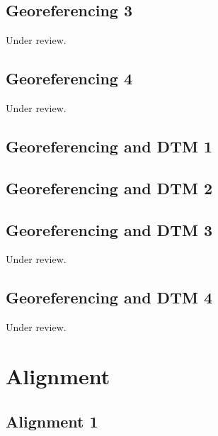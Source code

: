 \documentclass{scrartcl}
\begin{document}
\subsection{Georeferencing 3}
\label{sec:georeferencing_3}
Under review.%
\clearpage

\subsection{Georeferencing 4}
\label{sec:georeferencing_4}
Under review.%
\clearpage

\subsection{Georeferencing and DTM 1}
\label{sec:georef_tin_1}
\clearpage

\subsection{Georeferencing and DTM 2}
\label{sec:georef_tin_2}
\clearpage

\subsection{Georeferencing and DTM 3}
\label{sec:georef_tin_3}
Under review.%
\clearpage

\subsection{Georeferencing and DTM 4}
\label{sec:georef_tin_4}
Under review.%
\clearpage

\section{Alignment}

\subsection{Alignment 1}
\label{sec:align_1}
\clearpage
\end{document}

